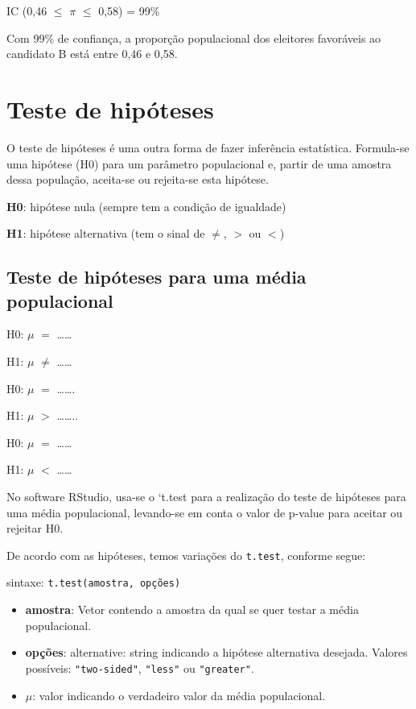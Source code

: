 \documentclass[12pt,brazil,oneside]{book}
\providecommand{\tightlist}{%
  \setlength{\itemsep}{0pt}\setlength{\parskip}{0pt}}
\begin{document}
IC (0,46 \(\leq\) \(\pi\) \(\leq\) 0,58) = 99\%

Com 99\% de confiança, a proporção populacional dos eleitores favoráveis
ao candidato B está entre 0,46 e 0,58.

\hypertarget{teste-de-hipoteses}{%
\section{Teste de hipóteses}\label{teste-de-hipoteses}}

O teste de hipóteses é uma outra forma de fazer inferência estatística.
Formula-se uma hipótese (H0) para um parâmetro populacional e, partir de
uma amostra dessa população, aceita-se ou rejeita-se esta hipótese.

\textbf{H0}: hipótese nula (sempre tem a condição de igualdade)

\textbf{H1}: hipótese alternativa (tem o sinal de \(\neq\), \(>\) ou
\(<\))

\hypertarget{teste-de-hipoteses-para-uma-media-populacional}{%
\subsection{Teste de hipóteses para uma média
populacional}\label{teste-de-hipoteses-para-uma-media-populacional}}

H0: \(\mu\) \(=\) \ldots{}\ldots{}

H1: \(\mu\) \(\neq\) \ldots{}\ldots{}

H0: \(\mu\) \(=\) \ldots{}\ldots{}.

H1: \(\mu\) \(>\) \ldots{}\ldots{}..

H0: \(\mu\) \(=\) \ldots{}\ldots{}

H1: \(\mu\) \(<\) \ldots{}\ldots{}

No software RStudio, usa-se o `t.test\textbar{} para a realização do
teste de hipóteses para uma média populacional, levando-se em conta o
valor de p-value para aceitar ou rejeitar H0.

De acordo com as hipóteses, temos variações do \texttt{t.test}, conforme
segue:

sintaxe: \texttt{t.test(amostra,\ opções)}

\begin{itemize}
\tightlist
\item
  \textbf{amostra}: Vetor contendo a amostra da qual se quer testar a
  média populacional.
\item
  \textbf{opções}: alternative: string indicando a hipótese alternativa
  desejada. Valores possíveis: \texttt{"two-sided"}, \texttt{"less"} ou
  \texttt{"greater"}.
\item
  \(\mu\): valor indicando o verdadeiro valor da média populacional.
\end{itemize}
\end{document}
